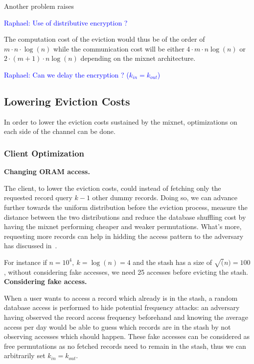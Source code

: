 \documentclass[english,oneside,twocolumn]{article}
\newcommand{\raphael}[1]{\textcolor{blue}{Raphael: #1}}
\begin{document}
Another problem raises

\raphael{Use of distributive encryption ?}

The computation cost of the eviction would thus be of the order of $m\cdot n \cdot \log(n)$ while the communication cost will be either $4\cdot m \cdot n \log(n)$ or $2\cdot(m+1) \cdot n \log(n)$ depending on the mixnet architecture.

\raphael{Can we delay the encryption ? ($k_{in}=k_{out}$)}

\subsection{Lowering Eviction Costs}

In order to lower the eviction costs sustained by the mixnet, optimizations on each side of the channel can be done.

\subsubsection{Client Optimization}
\noindent\textbf{Changing ORAM access.}

The client, to lower the eviction costs, could instead of fetching only the requested record query $k-1$ other dummy records. Doing so, we can advance further towards the uniform distribution before the eviction process, measure the distance between the two distributions and reduce the database shuffling cost by having the mixnet performing cheaper and weaker permutations.
What's more, requesting more records can help in hidding the access pattern to the adversary has discussed in~\cite{toledo2016lower}.

For instance if $n=10^4,\ k=\log(n)=4$ and the stash has a size of $\sqrt(n)=100$, without considering fake accesses, we need 25 accesses before evicting the stash.\\

\noindent\textbf{Considering fake access.}

When a user wants to access a record which already is in the stash, a random database access is performed to hide potential frequency attacks: an adversary having observed the record access frequency beforehand and knowing the average access per day would be able to guess which records are in the stash by not observing accesses which should happen.
These fake accesses can be considered as free permutations as no fetched records need to remain in the stash, thus we can arbitrarily set $k_{in}=k_{out}$.
\end{document}
